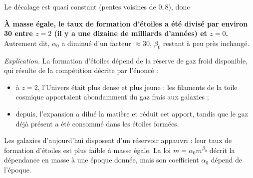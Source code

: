\documentclass[11pt,a4paper]{article}
\providecommand{\tightlist}{\setlength{\itemsep}{0pt}\setlength{\parskip}{0pt}}
\newcommand{\equationajustee}[1]{%
  \sbox{\boiteequation}{$\displaystyle #1$}%
  \ifdim\wd\boiteequation>\linewidth
    \[\resizebox{\linewidth}{!}{\usebox{\boiteequation}}\]%
  \else
    \[#1\]%
  \fi}
\begin{document}
Le décalage est quasi constant (pentes voisines de \(0{,}8\)), donc

\equationajustee{\frac{\dot m(z=2)}{\dot m(z=0)}\approx10^{1{,}5}\approx\underline{3\times10^1}}

\textbf{À masse égale, le taux de formation d'étoiles a été divisé par environ 30 entre \(z=2\) (il y a une dizaine de milliards d'années) et \(z=0\).} Autrement dit, \(\alpha_0\) a diminué d'un facteur \(\approx30\), \(\beta_0\) restant à peu près inchangé.

\emph{Explication.} La formation d'étoiles dépend de la réserve de gaz froid disponible, qui résulte de la compétition décrite par l'énoncé :

\begin{itemize}
\tightlist
\item
  à \(z=2\), l'Univers était plus dense et plus jeune ; les filaments de la toile cosmique apportaient abondamment du gaz frais aux galaxies ;
\item
  depuis, l'expansion a dilué la matière et réduit cet apport, tandis que le gaz déjà présent a été consommé dans les étoiles formées.
\end{itemize}

Les galaxies d'aujourd'hui disposent d'un réservoir appauvri : leur taux de formation d'étoiles est plus faible à masse égale. La loi \(\dot m=\alpha_0m^{\beta_0}\) décrit la dépendance en masse à une époque donnée, mais son coefficient \(\alpha_0\) dépend de l'époque.
\end{document}

